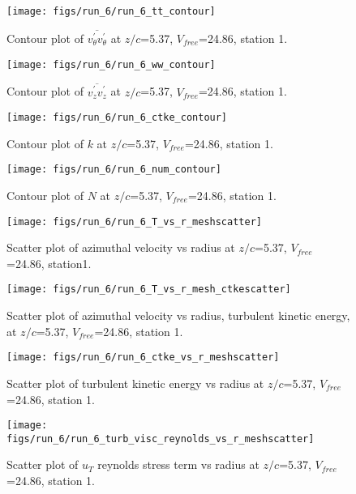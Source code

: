 \begin{figure}[H]
\centering
\texttt{[image: figs/run\_6/run\_6\_tt\_contour]}
\caption{Contour plot of $\overline{v_{\theta}^{\prime} v_{\theta}^{\prime}}$ at $z/c$=5.37, $V_{free}$=24.86, station 1.}
\end{figure}


\begin{figure}[H]
\centering
\texttt{[image: figs/run\_6/run\_6\_ww\_contour]}
\caption{Contour plot of $\overline{v_{z}^{\prime} v_{z}^{\prime}}$ at $z/c$=5.37, $V_{free}$=24.86, station 1.}
\end{figure}


\begin{figure}[H]
\centering
\texttt{[image: figs/run\_6/run\_6\_ctke\_contour]}
\caption{Contour plot of $k$ at $z/c$=5.37, $V_{free}$=24.86, station 1.}
\end{figure}


\begin{figure}[H]
\centering
\texttt{[image: figs/run\_6/run\_6\_num\_contour]}
\caption{Contour plot of $N$ at $z/c$=5.37, $V_{free}$=24.86, station 1.}
\end{figure}


\begin{figure}[H]
\centering
\texttt{[image: figs/run\_6/run\_6\_T\_vs\_r\_meshscatter]}
\caption{Scatter plot of azimuthal velocity vs radius at $z/c$=5.37, $V_{free}$=24.86, station1.}
\end{figure}


\begin{figure}[H]
\centering
\texttt{[image: figs/run\_6/run\_6\_T\_vs\_r\_mesh\_ctkescatter]}
\caption{Scatter plot of azimuthal velocity vs radius, turbulent kinetic energy, at $z/c$=5.37, $V_{free}$=24.86, station 1.}
\end{figure}


\begin{figure}[H]
\centering
\texttt{[image: figs/run\_6/run\_6\_ctke\_vs\_r\_meshscatter]}
\caption{Scatter plot of turbulent kinetic energy vs radius at $z/c$=5.37, $V_{free}$=24.86, station 1.}
\end{figure}


\begin{figure}[H]
\centering
\texttt{[image: figs/run\_6/run\_6\_turb\_visc\_reynolds\_vs\_r\_meshscatter]}
\caption{Scatter plot of $
u_T$ reynolds stress term vs radius at $z/c$=5.37, $V_{free}$=24.86, station 1.}
\end{figure}


